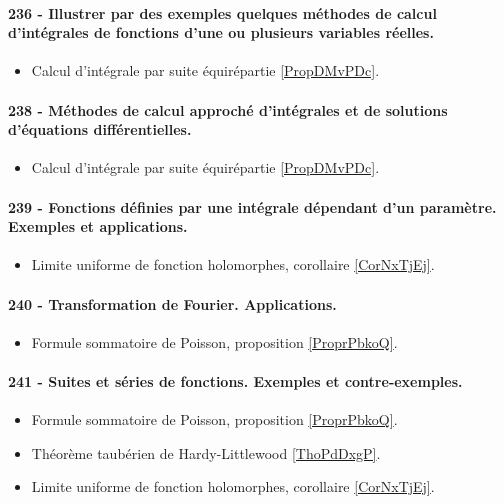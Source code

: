 \paragraph{236 - Illustrer par des exemples quelques méthodes de calcul d’intégrales de fonctions d’une ou plusieurs variables réelles.}
\begin{itemize}
    \item Calcul d'intégrale par suite équirépartie \ref{PropDMvPDc}.
\end{itemize}

\paragraph{238 - Méthodes de calcul approché d’intégrales et de solutions d’équations différentielles.}
\begin{itemize}
    \item Calcul d'intégrale par suite équirépartie \ref{PropDMvPDc}.
\end{itemize}

\paragraph{239 - Fonctions définies par une intégrale dépendant d’un paramètre. Exemples et applications.}
\begin{itemize}
    \item Limite uniforme de fonction holomorphes, corollaire \ref{CorNxTjEj}.
\end{itemize}

\paragraph{240 - Transformation de Fourier. Applications.}
\begin{itemize}
    \item Formule sommatoire de Poisson, proposition \ref{ProprPbkoQ}.
\end{itemize}
\paragraph{241 - Suites et séries de fonctions. Exemples et contre-exemples.}
\begin{itemize}
    \item Formule sommatoire de Poisson, proposition \ref{ProprPbkoQ}.
    \item Théorème taubérien de Hardy-Littlewood \ref{ThoPdDxgP}.
    \item Limite uniforme de fonction holomorphes, corollaire \ref{CorNxTjEj}.
\end{itemize}
